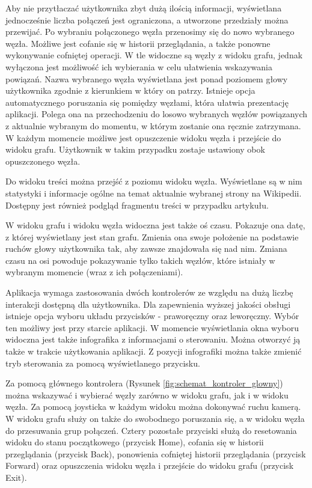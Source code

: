 Aby nie przytłaczać użytkownika zbyt dużą ilością informacji, wyświetlana jednocześnie liczba połączeń jest ograniczona, a utworzone przedziały można przewijać. Po wybraniu połączonego węzła przenosimy się do nowo wybranego węzła. Możliwe jest cofanie się w historii przeglądania, a także ponowne wykonywanie cofniętej operacji. W tle widoczne są węzły z widoku grafu, jednak wyłączona jest możliwość ich wybierania w celu ułatwienia wskazywania powiązań. Nazwa wybranego węzła wyświetlana jest ponad poziomem głowy użytkownika zgodnie z kierunkiem w który on patrzy. Istnieje opcja automatycznego poruszania się pomiędzy węzłami, która ułatwia prezentację aplikacji. Polega ona na przechodzeniu do losowo wybranych węzłów powiązanych z aktualnie wybranym do momentu, w którym zostanie ona ręcznie zatrzymana. W każdym momencie możliwe jest opuszczenie widoku węzła i przejście do widoku grafu. Użytkownik w takim przypadku zostaje ustawiony obok opuszczonego węzła. 

Do widoku treści można przejść z poziomu widoku węzła. Wyświetlane są w nim statystyki i informacje ogólne na temat aktualnie wybranej strony na Wikipedii. Dostępny jest również podgląd fragmentu treści w przypadku artykułu.

W widoku grafu i widoku węzła widoczna jest także oś czasu. Pokazuje ona datę, z której wyświetlany jest stan grafu. Zmienia ona swoje położenie na podstawie ruchów głowy użytkownika tak, aby zawsze znajdowała się nad nim. Zmiana czasu na osi powoduje pokazywanie tylko takich węzłów, które istniały w wybranym momencie (wraz z ich połączeniami).

Aplikacja wymaga zastosowania dwóch kontrolerów ze względu na dużą liczbę interakcji dostępną dla użytkownika. Dla zapewnienia wyższej jakości obsługi istnieje opcja wyboru układu przycisków - praworęczny oraz leworęczny. Wybór ten możliwy jest przy starcie aplikacji. W momencie wyświetlania okna wyboru widoczna jest także infografika z informacjami o sterowaniu. Można otworzyć ją także w trakcie użytkowania aplikacji. Z pozycji infografiki można także zmienić tryb sterowania za pomocą wyświetlanego przycisku.

Za pomocą głównego kontrolera (Rysunek \ref{fig:schemat_kontroler_glowny}) można wskazywać i wybierać węzły zarówno w widoku grafu, jak i w widoku węzła. Za pomocą joysticka w każdym widoku można dokonywać ruchu kamerą. W widoku grafu służy on także do swobodnego poruszania się, a w widoku węzła do przesuwania grup połączeń. Cztery pozostałe przyciski służą do resetowania widoku do stanu początkowego (przycisk Home), cofania się w historii przeglądania (przycisk Back), ponowienia cofniętej historii przeglądania (przycisk Forward) oraz opuszczenia widoku węzła i przejście do widoku grafu (przycisk Exit).

